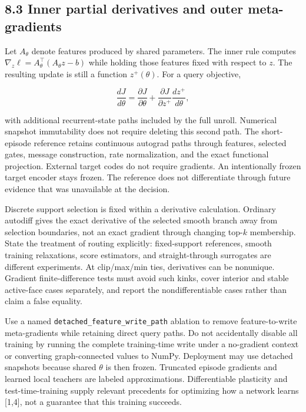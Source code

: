 \documentclass[
  11pt,
  a4paper,
]{article}
\begin{document}
\subsection{8.3 Inner partial derivatives and outer
meta-gradients}\label{inner-partial-derivatives-and-outer-meta-gradients}

Let \(A_\theta\) denote features produced by shared parameters. The
inner rule computes \(\nabla_z\ell=A_\theta^\top(A_\theta z-b)\) while
holding those features fixed with respect to \(z\). The resulting update
is still a function \(z^+(\theta)\). For a query objective,

\[
\frac{dJ}{d\theta}=\frac{\partial J}{\partial\theta}
+\frac{\partial J}{\partial z^+}\frac{dz^+}{d\theta},
\]

with additional recurrent-state paths included by the full unroll.
Numerical snapshot immutability does not require deleting this second
path. The short-episode reference retains continuous autograd paths
through features, selected gates, message construction, rate
normalization, and the exact functional projection. External target
codes do not require gradients. An intentionally frozen target encoder
stays frozen. The reference does not differentiate through future
evidence that was unavailable at the decision.

Discrete support selection is fixed within a derivative calculation.
Ordinary autodiff gives the exact derivative of the selected smooth
branch away from selection boundaries, not an exact gradient through
changing top-\(k\) membership. State the treatment of routing
explicitly: fixed-support references, smooth training relaxations, score
estimators, and straight-through surrogates are different experiments.
At clip/max/min ties, derivatives can be nonunique. Gradient
finite-difference tests must avoid such kinks, cover interior and stable
active-face cases separately, and report the nondifferentiable cases
rather than claim a false equality.

Use a named \texttt{detached\_feature\_write\_path} ablation to remove
feature-to-write meta-gradients while retaining direct query paths. Do
not accidentally disable all training by running the complete
training-time write under a no-gradient context or converting
graph-connected values to NumPy. Deployment may use detached snapshots
because shared \(\theta\) is then frozen. Truncated episode gradients
and learned local teachers are labeled approximations. Differentiable
plasticity and test-time-training supply relevant precedents for
optimizing how a network learns {[}1,4{]}, not a guarantee that this
training succeeds.
\end{document}
